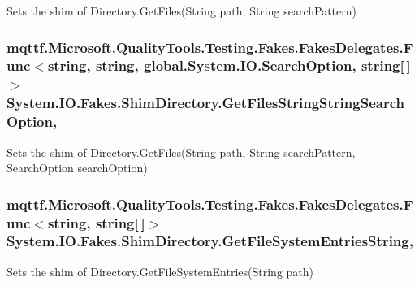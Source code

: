 Sets the shim of Directory.\-Get\-Files(\-String path, String search\-Pattern)

\hypertarget{class_system_1_1_i_o_1_1_fakes_1_1_shim_directory_aa5a17fff0389e4605513a0a24c41eccc}{
\subsubsection[{Get\-Files\-String\-String\-Search\-Option}]{\setlength{\rightskip}{0pt plus 5cm}mqttf.\-Microsoft.\-Quality\-Tools.\-Testing.\-Fakes.\-Fakes\-Delegates.\-Func$<$string, string, global.\-System.\-I\-O.\-Search\-Option, string\mbox{[}$\,$\mbox{]}$>$ System.\-I\-O.\-Fakes.\-Shim\-Directory.\-Get\-Files\-String\-String\-Search\-Option\hspace{0.3cm}{\ttfamily [static]}, {\ttfamily [set]}}}\label{class_system_1_1_i_o_1_1_fakes_1_1_shim_directory_aa5a17fff0389e4605513a0a24c41eccc}


Sets the shim of Directory.\-Get\-Files(\-String path, String search\-Pattern, Search\-Option search\-Option)

\hypertarget{class_system_1_1_i_o_1_1_fakes_1_1_shim_directory_a2ba1f89fdc604f67aad7c6ac87c90202}{
\subsubsection[{Get\-File\-System\-Entries\-String}]{\setlength{\rightskip}{0pt plus 5cm}mqttf.\-Microsoft.\-Quality\-Tools.\-Testing.\-Fakes.\-Fakes\-Delegates.\-Func$<$string, string\mbox{[}$\,$\mbox{]}$>$ System.\-I\-O.\-Fakes.\-Shim\-Directory.\-Get\-File\-System\-Entries\-String\hspace{0.3cm}{\ttfamily [static]}, {\ttfamily [set]}}}\label{class_system_1_1_i_o_1_1_fakes_1_1_shim_directory_a2ba1f89fdc604f67aad7c6ac87c90202}


Sets the shim of Directory.\-Get\-File\-System\-Entries(\-String path)

